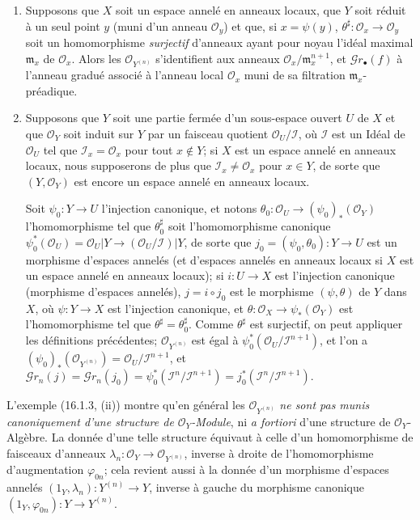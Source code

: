 \begin{examples}[16.1.3]
\label{IV.16.1.3}
\begin{enumerate}
\item[(i)] Supposons que $X$ soit un espace annelé en anneaux locaux, que $Y$ soit
réduit à un seul point $y$ (muni d'un anneau $\mathcal{O}_y$) et que, si
$x=\psi(y)$, $\theta^\sharp:\mathcal{O}_x\to\mathcal{O}_y$ soit un homomorphisme
\emph{surjectif} d'anneaux ayant pour noyau l'idéal maximal $\mathfrak{m}_x$ de
$\mathcal{O}_x$. Alors les $\mathcal{O}_{Y^{(n)}}$ s'identifient aux anneaux
$\mathcal{O}_x/\mathfrak{m}_x^{n+1}$, et $\mathscr{G}r_\bullet(f)$ à l'anneau
gradué associé à l'anneau local $\mathcal{O}_x$ muni de sa filtration
$\mathfrak{m}_x$-préadique.
\item[(ii)] Supposons que $Y$ soit une partie fermée d'un sous-espace ouvert $U$
de $X$ et que $\mathcal{O}_Y$ soit induit sur $Y$ par un faisceau quotient
$\mathcal{O}_U/\mathscr{I}$, où $\mathscr{I}$ est un Idéal de $\mathcal{O}_U$
tel que $\mathscr{I}_x=\mathcal{O}_x$ pour tout $x\notin Y$; si $X$ est un
espace annelé en anneaux locaux, nous supposerons de plus que
$\mathscr{I}_x\neq\mathcal{O}_x$ pour $x\in Y$, de sorte que
$(Y,\mathcal{O}_Y)$ est encore un espace annelé en anneaux locaux.

Soit $\psi_0:Y\to U$ l'injection canonique, et notons
$\theta_0:\mathcal{O}_U\to(\psi_0)_*(\mathcal{O}_Y)$ l'homomorphisme tel que
$\theta_0^\sharp$ soit l'homomorphisme canonique
$\psi_0^*(\mathcal{O}_U)=\mathcal{O}_U|Y\to
(\mathcal{O}_U/\mathscr{I})|Y$, de sorte que
$j_0=(\psi_0,\theta_0):Y\to U$ est un morphisme d'espaces annelés (et d'espaces
annelés en anneaux locaux si $X$ est un espace annelé en anneaux locaux); si
$i:U\to X$ est l'injection canonique (morphisme d'espaces annelés),
$j=i\circ j_0$ est le morphisme $(\psi,\theta)$ de $Y$ dans $X$, où
$\psi:Y\to X$ est l'injection canonique, et
$\theta:\mathcal{O}_X\to\psi_*(\mathcal{O}_Y)$ est l'homomorphisme tel que
$\theta^\sharp=\theta_0^\sharp$. Comme $\theta^\sharp$ est surjectif, on peut appliquer les
définitions précédentes; $\mathcal{O}_{Y^{(n)}}$ est égal à
$\psi_0^*(\mathcal{O}_U/\mathscr{I}^{n+1})$, et l'on a
$(\psi_0)_*(\mathcal{O}_{Y^{(n)}})=\mathcal{O}_U/\mathscr{I}^{n+1}$, et
$\mathscr{G}r_n(j)=\mathscr{G}r_n(j_0)=
\psi_0^*(\mathscr{I}^n/\mathscr{I}^{n+1})=
j_0^*(\mathscr{I}^n/\mathscr{I}^{n+1})$.
\end{enumerate}
\end{examples}

\begin{env}[16.1.4]
\label{IV.16.1.4}
L'exemple (16.1.3, (ii)) montre qu'en général les
$\mathcal{O}_{Y^{(n)}}$ \emph{ne sont pas munis canoniquement d'une structure de
$\mathcal{O}_Y$-Module}, ni \emph{a fortiori} d'une structure de
$\mathcal{O}_Y$-Algèbre. La donnée d'une telle structure équivaut à celle d'un
homomorphisme de faisceaux d'anneaux
$\lambda_n:\mathcal{O}_Y\to\mathcal{O}_{Y^{(n)}}$, inverse à droite de
l'homomorphisme d'augmentation $\varphi_{0n}$; cela revient aussi à la donnée
d'un morphisme d'espaces annelés
$(1_Y,\lambda_n):Y^{(n)}\to Y$, inverse à gauche du morphisme canonique
$(1_Y,\varphi_{0n}):Y\to Y^{(n)}$.
\end{env}

